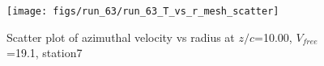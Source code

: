 \begin{figure}[H]
\centering
\texttt{[image: figs/run\_63/run\_63\_T\_vs\_r\_mesh\_scatter]}
\caption{Scatter plot of azimuthal velocity vs radius at $z/c$=10.00, $V_{free}$=19.1, station7}
\label{fig:run_63_T_vs_r_mesh_scatter}
\end{figure}


